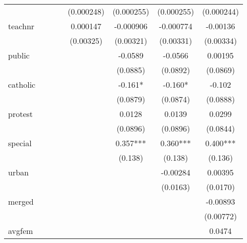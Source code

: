 \begin{table}[htbp]
\begin{tabular}{l*{7}{c}}
            &               &               &               &  (0.000248)   &  (0.000255)   &  (0.000255)   &  (0.000244)   \\
[1em]
teachnr     &               &               &               &    0.000147   &   -0.000906   &   -0.000774   &    -0.00136   \\
            &               &               &               &   (0.00325)   &   (0.00321)   &   (0.00331)   &   (0.00334)   \\
[1em]
public      &               &               &               &               &     -0.0589   &     -0.0566   &     0.00195   \\
            &               &               &               &               &    (0.0885)   &    (0.0892)   &    (0.0869)   \\
[1em]
catholic    &               &               &               &               &      -0.161*  &      -0.160*  &      -0.102   \\
            &               &               &               &               &    (0.0879)   &    (0.0874)   &    (0.0888)   \\
[1em]
protest     &               &               &               &               &      0.0128   &      0.0139   &      0.0299   \\
            &               &               &               &               &    (0.0896)   &    (0.0896)   &    (0.0844)   \\
[1em]
special     &               &               &               &               &       0.357***&       0.360***&       0.400***\\
            &               &               &               &               &     (0.138)   &     (0.138)   &     (0.136)   \\
[1em]
urban       &               &               &               &               &               &    -0.00284   &     0.00395   \\
            &               &               &               &               &               &    (0.0163)   &    (0.0170)   \\
[1em]
merged      &               &               &               &               &               &               &    -0.00893   \\
            &               &               &               &               &               &               &   (0.00772)   \\
[1em]
avgfem      &               &               &               &               &               &               &      0.0474   \\

\end{tabular}
\end{table}
